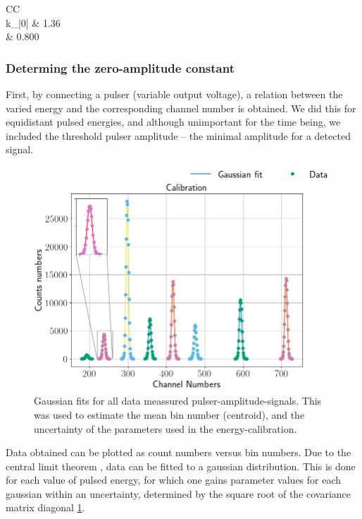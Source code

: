 \begin{table}[b]
\centering
\caption{The values of the parameters, used to convert channel numbers to
energies.}
\begin{tabular}{CC}
\toprule
{}\\
\midrule
k_|0| & 1.36 \\
\alpha & 0.800  \\
\bottomrule
\end{tabular}

\label{tab_parameters}
\end{table}

\subsubsection{Determing the zero-amplitude constant}
First, by connecting a pulser (variable output voltage), a relation between the
varied energy and the corresponding channel number is obtained. 
We did this for equidistant pulsed energies, and although unimportant for the
time being, we included the threshold pulser amplitude -- the minimal amplitude
for a detected signal.

\begin{figure}[t]
\centering
\includegraphics[width=0.99\columnwidth]{gaussian_fit}
\caption{Gaussian fits for all data meassured pulser-amplitude-signals. This was used to estimate the mean
bin number (centroid), and the uncertainty of the parameters used in the
energy-calibration.}
\label{fig_gaussian_fit}
\end{figure}
% 
Data obtained can be plotted as count numbers versus bin numbers. Due to the
central limit theorem \parencite[p. 49]{statistics}, data can be fitted to a
gaussian distribution. This is done for each value of pulsed energy, for which
one gains parameter values for each gaussian within an uncertainty, determined
by the square root of the covariance matrix diagonal \cref{fig_gaussian_fit}.

